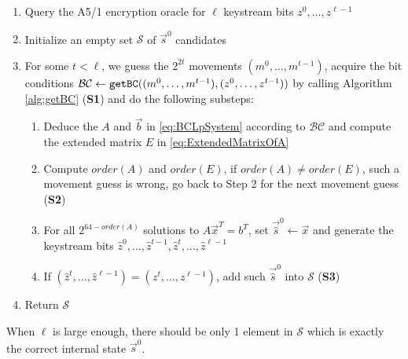 \begin{enumerate}
  \item Query the A5/1 encryption oracle for $\ell$ keystream bits $z^0,\ldots, z^{\ell-1}$
  \item Initialize an empty set $\mathcal{S}$ of $\vec{s}^0$ candidates
  \item For some $t<\ell$, we guess the $2^{2t}$ movements $(m^0,\ldots, m^{t-1})$, acquire the bit conditions $\mathcal{BC}\leftarrow {\tt getBC}((m^0,\ldots, m^{t-1}), (z^0,\ldots, z^{t-1}))$ by calling Algorithm \ref{alg:getBC} (\textbf{S1}) and do the following substeps:
      \begin{enumerate}
        \item Deduce the $A$ and $\vec b$ in \eqref{eq:BCLpSystem} according to $\mathcal{BC}$ and compute the extended matrix $E$ in \eqref{eq:ExtendedMatrixOfA}
        \item Compute $order(A)$ and $order(E)$, if $order(A)\neq order(E)$, such a movement guess is wrong, go back to Step 2 for the next movement guess (\textbf{S2})
        \item For all $2^{64-order(A)}$ solutions to $A\vec x^T=b^T$, set $\vec{\hat{s}}^0\leftarrow \vec x$ and generate the keystream bits $\hat{z}^0,\ldots, \hat{z}^{t-1},\hat{z}^{t},\ldots, \hat{z}^{\ell-1}$
        \item If $(\hat{z}^{t},\ldots, \hat{z}^{\ell-1})=(z^{t},\ldots, z^{\ell-1})$, add such $\vec{\hat{s}}^0$ into $\mathcal{S}$ (\textbf{S3})
      \end{enumerate}
  \item Return $\mathcal{S}$
\end{enumerate}
When $\ell$ is large enough, there should be only 1 element in $\mathcal{S}$ which is exactly the correct internal state $\vec{s}^0$.

